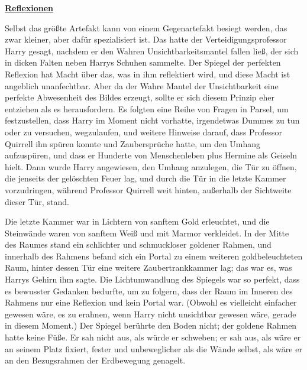 

\hypertarget{reflexionen}{%

\textbf{\uline{Reflexionen}}

Selbst das größte Artefakt kann von einem Gegenartefakt besiegt werden, das zwar kleiner, aber dafür spezialisiert ist. Das hatte der Verteidigungsprofessor Harry gesagt, nachdem er den Wahren Unsichtbarkeitsmantel fallen ließ, der sich in dicken Falten neben Harrys Schuhen sammelte. Der Spiegel der perfekten Reflexion hat Macht über das, was in ihm reflektiert wird, und diese Macht ist angeblich unanfechtbar. Aber da der Wahre Mantel der Unsichtbarkeit eine perfekte Abwesenheit des Bildes erzeugt, sollte er sich diesem Prinzip eher entziehen als es herausfordern. Es folgten eine Reihe von Fragen in Parsel, um festzustellen, dass Harry im Moment nicht vorhatte, irgendetwas Dummes zu tun oder zu versuchen, wegzulaufen, und weitere Hinweise darauf, dass Professor Quirrell ihn spüren konnte und Zaubersprüche hatte, um den Umhang aufzuspüren, und dass er Hunderte von Menschenleben plus Hermine als Geiseln hielt. Dann wurde Harry angewiesen, den Umhang anzulegen, die Tür zu öffnen, die jenseits der gelöschten Feuer lag, und durch die Tür in die letzte Kammer vorzudringen, während Professor Quirrell weit hinten, außerhalb der Sichtweite dieser Tür, stand.

Die letzte Kammer war in Lichtern von sanftem Gold erleuchtet, und die Steinwände waren von sanftem Weiß und mit Marmor verkleidet. In der Mitte des Raumes stand ein schlichter und schmuckloser goldener Rahmen, und innerhalb des Rahmens befand sich ein Portal zu einem weiteren goldbeleuchteten Raum, hinter dessen Tür eine weitere Zaubertrankkammer lag; das war es, was Harrys Gehirn ihm sagte. Die Lichtumwandlung des Spiegels war so perfekt, dass es bewusster Gedanken bedurfte, um zu folgern, dass der Raum im Inneren des Rahmens nur eine Reflexion und kein Portal war. (Obwohl es vielleicht einfacher gewesen wäre, es zu erahnen, wenn Harry nicht unsichtbar gewesen wäre, gerade in diesem Moment.) Der Spiegel berührte den Boden nicht; der goldene Rahmen hatte keine Füße. Er sah nicht aus, als würde er schweben; er sah aus, als wäre er an seinem Platz fixiert, fester und unbeweglicher als die Wände selbst, als wäre er an den Bezugsrahmen der Erdbewegung genagelt.

}
